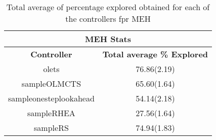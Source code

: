 \begin{table}[h!]
\begin{center}
\begin{adjustbox}{width=0.5\textwidth}
\begin{tabular}{|c|c|}
\hline
\multicolumn{2}{|c|}{\textbf{MEH Stats}}\\
\hline\hline
\textbf{Controller} & \textbf{Total average \% Explored}\\
\hline
\hline
olets & 76.86(2.19)
 \\
\hline
sampleOLMCTS & 65.60(1.64)
 \\
\hline
sampleonesteplookahead & 54.14(2.18)
 \\
\hline
sampleRHEA & 27.56(1.64)
 \\
\hline
sampleRS & 74.94(1.83)
 \\
\hline
\end{tabular}
\end{adjustbox}
\caption{Total average of percentage explored obtained for each of the controllers fpr MEH}
\label{table:stats_MEH}
\end{center}
\end{table}
